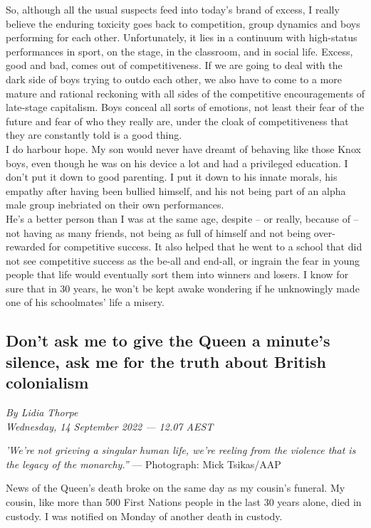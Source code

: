 \documentclass[a4paper]{article}
\begin{document}
So, although all the usual suspects feed into today’s brand of excess, I really believe the enduring toxicity goes back to competition, group dynamics and boys performing for each other. Unfortunately, it lies in a continuum with high-status performances in sport, on the stage, in the classroom, and in social life. Excess, good and bad, comes out of competitiveness. If we are going to deal with the dark side of boys trying to outdo each other, we also have to come to a more mature and rational reckoning with all sides of the competitive encouragements of late-stage capitalism. Boys conceal all sorts of emotions, not least their fear of the future and fear of who they really are, under the cloak of competitiveness that they are constantly told is a good thing.\\

I do harbour hope. My son would never have dreamt of behaving like those Knox boys, even though he was on his device a lot and had a privileged education. I don’t put it down to good parenting. I put it down to his innate morals, his empathy after having been bullied himself, and his not being part of an alpha male group inebriated on their own performances.\\

He’s a better person than I was at the same age, despite – or really, because of – not having as many friends, not being as full of himself and not being over-rewarded for competitive success. It also helped that he went to a school that did not see competitive success as the be-all and end-all, or ingrain the fear in young people that life would eventually sort them into winners and losers. I know for sure that in 30 years, he won’t be kept awake wondering if he unknowingly made one of his schoolmates’ life a misery.\\

\newpage
\subsection{Don’t ask me to give the Queen a minute’s silence, ask me for the truth about British colonialism}

\textit{By Lidia Thorpe\\Wednesday, 14 September 2022 — 12.07 AEST}

\textit{'We’re not grieving a singular human life, we’re reeling from the violence that is the legacy of the monarchy.”} — Photograph: Mick Tsikas/AAP

News of the Queen’s death broke on the same day as my cousin’s funeral. My cousin, like more than 500 First Nations people in the last 30 years alone, died in custody. I was notified on Monday of another death in custody.
\end{document}
